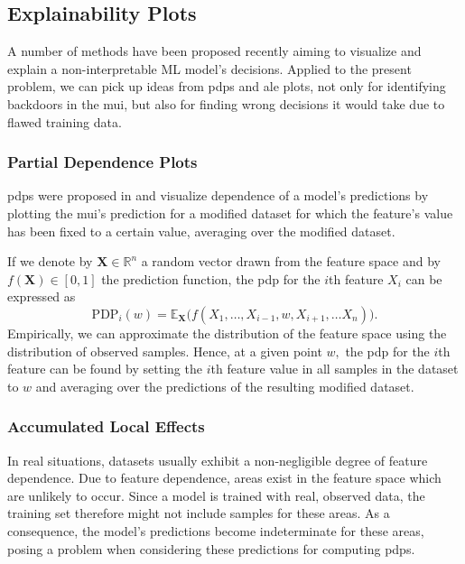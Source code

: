 \documentclass[9pt,sigconf,letterpaper,dvipsnames\ifx\removeHeaders\tempYes ,nonacm\fi]{acmart}
\begin{document}
\subsection{Explainability Plots} \label{sec:plots}
A number of methods have been proposed recently aiming to visualize and explain a non-interpretable ML model's decisions.
Applied to the present problem, we can pick up ideas from \glspl{pdp} and \gls{ale} plots, not only for identifying backdoors in the \gls{mui}, but also for finding wrong decisions it would take due to flawed training data.

\subsubsection{Partial Dependence Plots}
\glspl{pdp} were proposed in \cite{friedman_greedy_2001} and visualize dependence of a model's predictions by plotting the \gls{mui}'s prediction for a modified dataset for which the feature's value has been fixed to a certain value, averaging over the modified dataset.

If we denote by $\boldsymbol X \in \mathbb R ^n$ a random vector drawn from the feature space and by $f(\boldsymbol X) \in [0,1]$ the  prediction function, the \gls{pdp} for the $i$th feature $X_i$ can be expressed as
\begin{equation}
\text{PDP}_i(w) = \mathbb E_{\boldsymbol X}\Big(f(X_1,\ldots,X_{i-1},w,X_{i+1},\ldots X_n)\Big) . %
\end{equation}
Empirically, we can approximate the distribution of the feature space using the distribution of observed samples. Hence, at a given point $w,$ the \gls{pdp} for the $i$th feature can be found by 
setting the $i$th feature value in all samples in the dataset to $w$
and averaging over the predictions of the resulting modified dataset.

\subsubsection{Accumulated Local Effects}
In real situations, datasets usually exhibit a non-negligible degree of feature dependence. 
Due to feature dependence,
 areas exist in the feature space which are  unlikely
to occur. Since a model is trained with real, observed data, the training set therefore might not include samples for these areas.
As a consequence,
the model's predictions become indeterminate for these areas, %
posing a
problem when considering these predictions for computing \glspl{pdp}.
\end{document}

